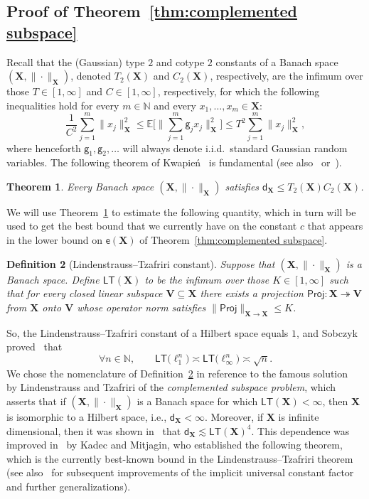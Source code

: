 \documentclass[11pt,reqno]{amsart}
\renewcommand{\le}{\leqslant}
\newcommand{\dd}{\mathsf{d}}
\newcommand{\proj}{\mathsf{Proj}}
\newcommand{\X}{\mathbf X}
\newtheorem{theorem}{Theorem}
\newtheorem{definition}[theorem]{Definition}
\theoremstyle{remark}
\renewcommand{\subset}{\subseteq}
\newcommand{\E}{\mathbb{ E}}
\newcommand{\N}{\mathbb N}
\newcommand{\ee}{\mathsf{e}}
\renewcommand{\1}{\mathbf 1}
\newcommand{\g}{\mathsf{g}}
\newcommand{\LT}{\mathsf{LT}}
\begin{document}
\subsection{Proof of Theorem~\ref{thm:complemented subspace}}
Recall that the (Gaussian) type $2$ and cotype $2$ constants of a Banach space $(\X,\|\cdot\|_{\X})$, denoted $T_2(\X)$ and $C_2(\X)$, respectively, are the infimum over those $T\in [1,\infty]$ and $C\in [1,\infty]$, respectively, for which the following inequalities hold for every $m\in \N$ and every $x_1,\ldots,x_m\in \X$:
\begin{equation}\label{eq:def type cotype-older}
\frac{1}{C^2}\sum_{j=1}^m\|x_j\|^2_{\X}\le \E\bigg[\Big\|\sum_{j=1}^m \g_j x_j\Big\|_{\X}^2\bigg] \le T^2\sum_{j=1}^m\|x_j\|^2_{\X},
\end{equation}
where  henceforth $\g_1,\g_2,\ldots$ will always denote  i.i.d.~standard Gaussian random variables. The following theorem of Kwapie\'n~\cite{Kwa72} is fundamental (see also~\cite[Theorem~3.3]{Pis-factorization} or~\cite[Theorem~13.15]{Tom89}).

\begin{theorem}\label{thm:Kwapien}
Every Banach space $(\X,\|\cdot\|_{\X})$ satisfies $\dd_{\X}\le T_2(\X)C_2(\X)$.
\end{theorem}

We will use Theorem~\ref{thm:Kwapien} to estimate the following quantity, which in turn will be used to get the best bound that we currently have on the constant $c$ that appears in the lower bound on $\ee(\X)$ of Theorem~\ref{thm:complemented subspace}.



\begin{definition}[Lindenstrauss--Tzafriri constant]\label{def:LT} Suppose that $(\X,\|\cdot\|_{\X})$ is a Banach space. Define $\LT(\X)$ to be the infimum over those $K\in [1,\infty]$ such that for every closed linear subspace $\mathbf{V}\subset \X$ there exists a projection $\proj:\X\twoheadrightarrow \mathbf{V}$ from $\X$ onto $\mathbf{V}$ whose operator norm satisfies $\|\proj\|_{\X\to\X}\le K$.
\end{definition}

So, the Lindenstrauss--Tzafriri constant of a Hilbert space equals $1$, and Sobczyk proved~\cite{Sob41} that
\begin{equation}\label{eq:sobczyk}
\forall n\in \N,\qquad \LT\big(\ell_1^n\big)\asymp \LT\big(\ell_\infty^n\big)\asymp \sqrt{n}.
\end{equation}
We chose the nomenclature of Definition~\ref{def:LT} in reference to the  famous solution~\cite{LT71} by Lindenstrauss and Tzafriri of the {\em complemented subspace problem}, which asserts that if   $(\X,\|\cdot\|_{\X})$ is a Banach space for which $\LT(\X)<\infty$, then $\X$ is isomorphic to a Hilbert space, i.e., $\dd_{\X}<\infty$. Moreover, if $\X$ is infinite dimensional, then it was shown in~\cite{LT71} that $\dd_{\X}\lesssim \LT(\X)^4$. This dependence was improved in~\cite{KM73} by  Kadec and Mitjagin, who established the following theorem, which is the currently best-known bound in the Lindenstrauss--Tzafriri theorem  (see also~\cite{Fig77,Pis88,Pis96,AK06,Kal08}  for subsequent improvements of the implicit universal constant factor and further generalizations).
\end{document}
